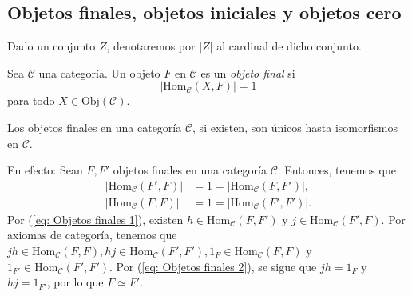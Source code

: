 \documentclass[tesis]{subfiles}
\begin{document}
\subsection*{Objetos finales, objetos iniciales y objetos cero} \label{Ssec: Objetos finales, objetos iniciales y objetos cero} %

\begin{Nota}
    Dado un conjunto $Z$, denotaremos por $|Z|$ al cardinal de dicho conjunto.
\end{Nota}

\begin{Def}\label{Def: Objeto final}
    Sea $\mathscr{C}$ una categoría. Un objeto $F$ en $\mathscr{C}$ es un \emph{objeto final} si
    \[
    |\text{Hom}_\mathscr{C}(X,F)| = 1
    \] 
    para todo $X\in\text{Obj}(\mathscr{C})$.
\end{Def}

\begin{Obs} \label{Unicidad de objetos finales hasta isomorfismo}
    Los objetos finales en una categoría $\mathscr{C}$, si existen, son únicos hasta isomorfismos en $\mathscr{C}$.

    \vspace{1mm}
    En efecto: Sean $F,F'$ objetos finales en una categoría $\mathscr{C}$. Entonces, tenemos que
    \begin{align}
        |\text{Hom}_\mathscr{C}(F',F)| &= 1 = |\text{Hom}_\mathscr{C}(F,F')|, \label{eq: Objetos finales 1} \\
        |\text{Hom}_\mathscr{C}(F,F)| &= 1 = |\text{Hom}_\mathscr{C}(F',F')|. \label{eq: Objetos finales 2}
    \end{align}
    Por (\ref{eq: Objetos finales 1}), existen $h\in\text{Hom}_\mathscr{C}(F,F')$ y $j\in\text{Hom}_\mathscr{C}(F',F)$. Por axiomas de categoría, tenemos que $jh\in\text{Hom}_\mathscr{C}(F,F), hj\in\text{Hom}_\mathscr{C}(F',F'), 1_F\in\text{Hom}_\mathscr{C}(F,F)$ y $1_{F'}\in\text{Hom}_\mathscr{C}(F',F')$. Por (\ref{eq: Objetos finales 2}), se sigue que $jh=1_F$ y $hj=1_{F'}$, por lo que $F\simeq F'$.
\end{Obs}
\end{document}
